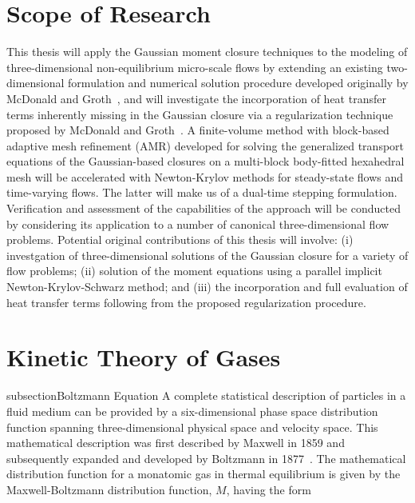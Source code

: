 \documentclass[titlepage,11pt,letterpaper]{article}
\begin{document}
\section{Scope of Research}

This thesis will apply the Gaussian moment closure techniques to the modeling of 
three-dimensional non-equilibrium micro-scale flows by extending an existing two-dimensional 
formulation and numerical solution procedure developed originally by 
McDonald and Groth~\cite{mcdonald:2005a}, and will investigate the incorporation of 
heat transfer terms inherently missing in the Gaussian closure via a regularization 
technique proposed by McDonald and Groth~\cite{mcdonald:2008}. A finite-volume method with 
block-based adaptive mesh refinement (AMR) developed for solving the generalized transport 
equations of the Gaussian-based closures on a multi-block body-fitted hexahedral mesh will 
be accelerated with Newton-Krylov methods for steady-state flows and time-varying flows. The 
latter will make us of a dual-time stepping formulation. Verification and assessment of the 
capabilities of the approach will be conducted by considering its application to a number of 
canonical three-dimensional flow problems. Potential original contributions of this thesis 
will involve: (i) investgation of three-dimensional solutions of the Gaussian closure for a variety of 
flow problems; (ii) solution of the moment equations using a parallel implicit 
Newton-Krylov-Schwarz method; and (iii) the incorporation and full evaluation of heat 
transfer terms following from the proposed regularization procedure.

\section{Kinetic Theory of Gases}

subsection{Boltzmann Equation}
A complete statistical description of particles in a fluid medium can be provided by a 
six-dimensional phase space distribution function spanning three-dimensional physical space 
and velocity space. This mathematical description was first described by Maxwell in 1859 and 
subsequently expanded and developed by Boltzmann in 1877~\cite{gombosi:1994a}. The 
mathematical distribution function for a monatomic gas in thermal equilibrium is given by 
the Maxwell-Boltzmann distribution function, $M$, having the form
\end{document}
